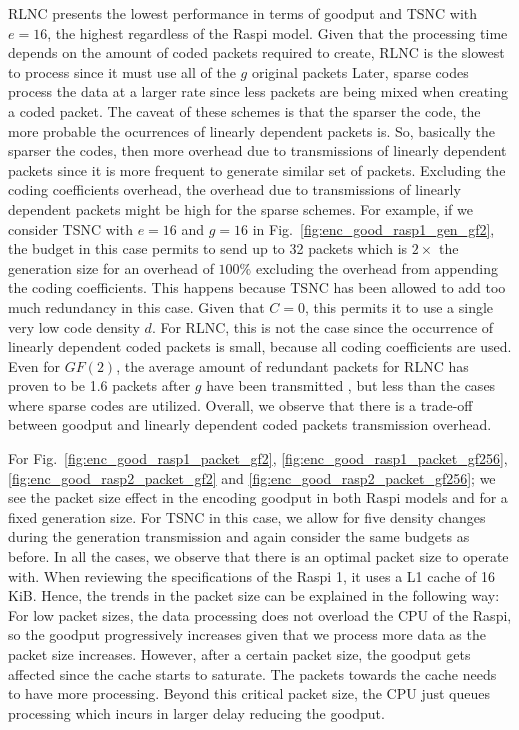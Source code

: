 \ac{RLNC} presents the lowest performance in terms of goodput and
\ac{TSNC} with $e = 16$, the highest regardless of the \ac{Raspi} model.
Given that the processing time depends on the amount of coded packets
required to create, \ac{RLNC} is the slowest to process since it must
use all of the $g$ original packets
Later, sparse codes process the data
at a larger rate since less packets are being mixed when creating a
coded packet. The caveat of these schemes is that the sparser the code,
the more probable the ocurrences of linearly dependent packets is. So, basically
the sparser the codes, then more overhead due to transmissions of linearly dependent
packets since it is more frequent to generate similar set of packets.
Excluding the coding coefficients overhead, the overhead due to
transmissions of linearly dependent packets might be high for the sparse schemes.
For example, if we consider \ac{TSNC} with $e = 16$ and $g = 16$
in Fig.~\ref{fig:enc_good_rasp1_gen_gf2}, the budget in this case permits
to send up to 32 packets which is $2\times$ the generation
size for an overhead of $100\%$ excluding the overhead from appending
the coding coefficients. This happens because \ac{TSNC}
has been allowed to add too much redundancy in this case. Given that $C=0$,
this permits it to use a single very low code density $d$. For \ac{RLNC},
this is not the case since the occurrence of linearly dependent coded packets is
small, because all coding coefficients are used. Even for $GF(2)$, the
average amount of redundant packets for \ac{RLNC} has proven to be 1.6
packets after $g$ have been transmitted \cite{trullols2011exact,zhao2012notes},
but less than the cases where sparse codes are utilized. Overall, we
observe that there is a trade-off between goodput and linearly dependent coded
packets transmission overhead.

For Fig.~\ref{fig:enc_good_rasp1_packet_gf2},
\ref{fig:enc_good_rasp1_packet_gf256}, \ref{fig:enc_good_rasp2_packet_gf2}
and \ref{fig:enc_good_rasp2_packet_gf256}; we see the packet
size effect in the encoding goodput in both \ac{Raspi} models and for
a fixed generation size. For \ac{TSNC} in this case, we allow for five density
changes during the generation transmission and again consider the same
budgets as before. In all the cases, we observe that there is an
optimal packet size to operate with. When reviewing the specifications
of the \ac{Raspi} 1, it uses a L1 cache of 16 KiB. Hence, the trends
in the packet size can be explained in the following way: For low packet
sizes, the data processing does not overload the \ac{CPU} of the
\ac{Raspi}, so the goodput progressively increases given that we
process more data as the packet size increases. However, after a certain
packet size, the goodput gets affected since the cache starts to saturate.
The packets towards the cache needs to have more processing. Beyond this
critical packet size, the \ac{CPU} just queues processing which incurs in
larger delay reducing the goodput.


